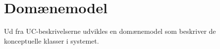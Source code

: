 \section{Domænemodel}
\label{sec:Domainmodel}
Ud fra UC-beskrivelserne udvikles en domænemodel som beskriver de konceptuelle klasser i systemet.

